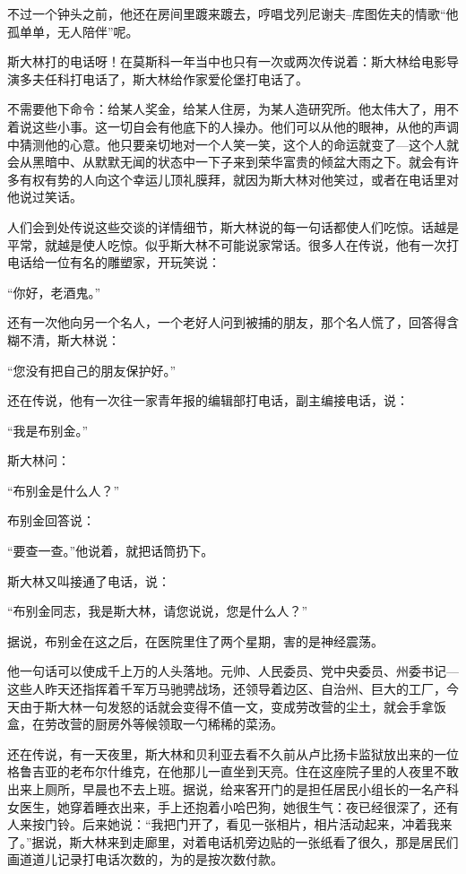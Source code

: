 不过一个钟头之前，他还在房间里踱来踱去，哼唱戈列尼谢夫–库图佐夫的情歌“他孤单单，无人陪伴”呢。

斯大林打的电话呀！在莫斯科一年当中也只有一次或两次传说着：斯大林给电影导演多夫任科打电话了，斯大林给作家爱伦堡打电话了。

不需要他下命令：给某人奖金，给某人住房，为某人造研究所。他太伟大了，用不着说这些小事。这一切自会有他底下的人操办。他们可以从他的眼神，从他的声调中猜测他的心意。他只要亲切地对一个人笑一笑，这个人的命运就变了—这个人就会从黑暗中、从默默无闻的状态中一下子来到荣华富贵的倾盆大雨之下。就会有许多有权有势的人向这个幸运儿顶礼膜拜，就因为斯大林对他笑过，或者在电话里对他说过笑话。

人们会到处传说这些交谈的详情细节，斯大林说的每一句话都使人们吃惊。话越是平常，就越是使人吃惊。似乎斯大林不可能说家常话。很多人在传说，他有一次打电话给一位有名的雕塑家，开玩笑说：

“你好，老酒鬼。”

还有一次他向另一个名人，一个老好人问到被捕的朋友，那个名人慌了，回答得含糊不清，斯大林说：

“您没有把自己的朋友保护好。”

还在传说，他有一次往一家青年报的编辑部打电话，副主编接电话，说：

“我是布别金。”

斯大林问：

“布别金是什么人？”

布别金回答说：

“要查一查。”他说着，就把话筒扔下。

斯大林又叫接通了电话，说：

“布别金同志，我是斯大林，请您说说，您是什么人？”

据说，布别金在这之后，在医院里住了两个星期，害的是神经震荡。

他一句话可以使成千上万的人头落地。元帅、人民委员、党中央委员、州委书记—这些人昨天还指挥着千军万马驰骋战场，还领导着边区、自治州、巨大的工厂，今天由于斯大林一句发怒的话就会变得不值一文，变成劳改营的尘土，就会手拿饭盒，在劳改营的厨房外等候领取一勺稀稀的菜汤。

还在传说，有一天夜里，斯大林和贝利亚去看不久前从卢比扬卡监狱放出来的一位格鲁吉亚的老布尔什维克，在他那儿一直坐到天亮。住在这座院子里的人夜里不敢出来上厕所，早晨也不去上班。据说，给来客开门的是担任居民小组长的一名产科女医生，她穿着睡衣出来，手上还抱着小哈巴狗，她很生气：夜已经很深了，还有人来按门铃。后来她说：“我把门开了，看见一张相片，相片活动起来，冲着我来了。”据说，斯大林来到走廊里，对着电话机旁边贴的一张纸看了很久，那是居民们画道道儿记录打电话次数的，为的是按次数付款。


